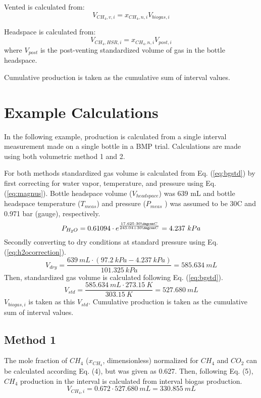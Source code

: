 \documentclass[]{article}
\begin{document}
Vented  is calculated from:
\begin{equation}
  V_{CH_4, v, i} = x_{CH_4, n, i} V_{biogas, i}
\end{equation}

Headspace  is calculated from:
\begin{equation}
  V_{CH_4, HSR, i} = x_{CH_4, n, i} V_{post, i}
\end{equation}
where $V_{post}$ is the post-venting standardized volume of gas in the bottle headspace.

Cumulative production is taken as the cumulative sum of interval values. 

\section{Example Calculations}
In the following example,  production is calculated from a single interval measurement made on a single bottle in a BMP trial. Calculations are made using both volumetric method 1 and 2. 

For both methods standardized gas volume is calculated from Eq. (\ref{eq:bgstd}) by first correcting for water vapor, temperature, and pressure using Eq. (\ref{eq:magnus}). Bottle headspace volume ($V_{headspace}$) was 639 mL and bottle headspace temperature ($T_{meas}$)  and pressure ($P_{meas}$ ) was assumed to be 30\degree C and 0.971 bar (gauge), respectively. 
\begin{equation*}
   P_{H_2O} = 0.61094 \cdot e^{\frac{17.625 \cdot 30 \degree C}{243.04 + 30 \degree C}} = 4.237\ kPa
\end{equation*}
Secondly converting to dry conditions at standard pressure using Eq. (\ref{eq:h2ocorrection}).
\begin{equation*}
   V_{dry} = \frac{639\ mL \cdot (97.2\ kPa - 4.237\ kPa)}{101.325\ kPa} = 585.634\ mL  
\end{equation*}
Then, standardized gas volume is calculated following Eq. (\ref{eq:bgstd}).
\begin{equation*}
    V_{std} = \frac{585.634\ mL \cdot 273.15\ K}{303.15\ K} = 527.680\ mL  
\end{equation*}
$V_{biogas,i}$ is taken as this $V_{std}$. Cumulative production is taken as the cumulative sum of interval values.
\subsection{Method 1}
The mole fraction of $CH_{4}$ ($x_{CH_4}$, dimensionless) normalized for $CH_{4}$ and $CO_{2}$ can be calculated according Eq. (4), but was given as 0.627. 
Then, following Eq. (5), $CH_{4}$ production in the interval is calculated from interval biogas production.
\begin{equation*}
  V_{CH_4, i} = 0.672 \cdot 527.680\ mL  = 330.855\ mL 
\end{equation*}
\end{document}
